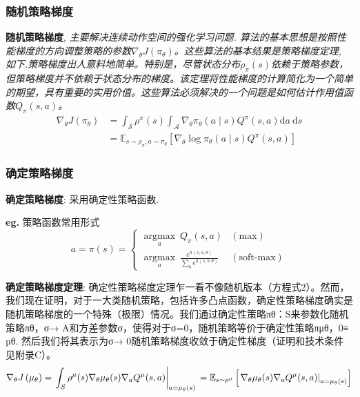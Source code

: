 \documentclass{article}
\begin{document}
    \subsubsection{随机策略梯度}
        \textbf{随机策略梯度}, \textit{主要解决连续动作空间的强化学习问题. 算法的基本思想是按照性能梯度的方向调整策略的参数$\nabla_{\theta} J\left(\pi_{\theta}\right)$。这些算法的基本结果是策略梯度定理, 如下.策略梯度出人意料地简单。特别是，尽管状态分布$\rho_\pi(s)$依赖于策略参数，但策略梯度并不依赖于状态分布的梯度。该定理将性能梯度的计算简化为一个简单的期望，具有重要的实用价值。这些算法必须解决的一个问题是如何估计作用值函数$Q_\pi(s, a)$。}
            $$\begin{aligned}
                \nabla_{\theta} J\left(\pi_{\theta}\right) &=\int_{\mathcal{S}} \rho^{\pi}(s) \int_{\mathcal{A}} \nabla_{\theta} \pi_{\theta}(a \mid s) Q^{\pi}(s, a) \mathrm{d} a \mathrm{~d} s \\
                &=\mathbb{E}_{s \sim \rho_{\pi}, a \sim \pi_{\theta}}\left[\nabla_{\theta} \log \pi_{\theta}(a \mid s) Q^{\pi}(s, a)\right]
            \end{aligned}$$
            
    \subsubsection{确定策略梯度} 
        \textbf{确定策略梯度}: 采用确定性策略函数.
        
        \textbf{eg.} 策略函数常用形式
        \begin{displaymath} a = \pi(s) = \left\{ \begin{array}{lr}
            \underset{a}{\operatorname{argmax}}\ Q_\pi(s, a)    & (\text{max})\\
            \underset{a}{\operatorname{argmax}}\ \frac{e^{h(s, a, \theta)}}{\sum_{b} e^{h(s, b, \theta)}}    & (\text{soft-max})
        \end{array} \right. \end{displaymath}
        
        \textbf{确定策略梯度定理}: 确定性策略梯度定理乍一看不像随机版本（方程式2）。然而，我们现在证明，对于一大类随机策略，包括许多凸点函数，确定性策略梯度确实是随机策略梯度的一个特殊（极限）情况。我们通过确定性策略πθ：S来参数化随机策略πθ，σ→ A和方差参数σ，使得对于σ=0，随机策略等价于确定性策略πμθ，0≡ µθ. 然后我们将其表示为σ→ 0随机策略梯度收敛于确定性梯度（证明和技术条件见附录C）。
            $$\nabla_{\theta} J\left(\mu_{\theta}\right) =\left.\int_{\mathcal{S}} \rho^{\mu}(s) \nabla_{\theta} \mu_{\theta}(s) \nabla_{a} Q^{\mu}(s, a)\right|_{a=\mu_{\theta}(s)} \\=\mathbb{E}_{s \sim \rho^{\mu}}\left[\left.\nabla_{\theta} \mu_{\theta}(s) \nabla_{a} Q^{\mu}(s, a)\right|_{a=\mu_{\theta}(s)}\right]$$ 
            
\end{document}
